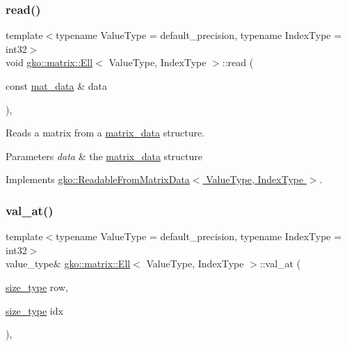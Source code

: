 \mbox{\label{classgko_1_1matrix_1_1Ell_a2c877d9f7bbc57f97df5ab443954a6fd}} 
\subsubsection{\texorpdfstring{read()}{read()}}
{\footnotesize\ttfamily template$<$typename Value\+Type = default\+\_\+precision, typename Index\+Type = int32$>$ \\
void \hyperlink{classgko_1_1matrix_1_1Ell}{gko\+::matrix\+::\+Ell}$<$ Value\+Type, Index\+Type $>$\+::read (\begin{DoxyParamCaption}\item[{const \hyperlink{structgko_1_1matrix__data}{mat\+\_\+data} \&}]{data }\end{DoxyParamCaption})\hspace{0.3cm}{\ttfamily [override]}, {\ttfamily [virtual]}}



Reads a matrix from a \hyperlink{structgko_1_1matrix__data}{matrix\+\_\+data} structure. 


\begin{DoxyParams}{Parameters}
{\em data} & the \hyperlink{structgko_1_1matrix__data}{matrix\+\_\+data} structure \\
\hline
\end{DoxyParams}


Implements \hyperlink{classgko_1_1ReadableFromMatrixData_add5c12e23b3ac3c8fbd607fa5a9656bb}{gko\+::\+Readable\+From\+Matrix\+Data$<$ Value\+Type, Index\+Type $>$}.

\mbox{\label{classgko_1_1matrix_1_1Ell_a0d2365837e44dc1889fc16000ff3b0a9}} 
\subsubsection{\texorpdfstring{val\+\_\+at()}{val\_at()}\hspace{0.1cm}{\footnotesize\ttfamily [1/2]}}
{\footnotesize\ttfamily template$<$typename Value\+Type = default\+\_\+precision, typename Index\+Type = int32$>$ \\
value\+\_\+type\& \hyperlink{classgko_1_1matrix_1_1Ell}{gko\+::matrix\+::\+Ell}$<$ Value\+Type, Index\+Type $>$\+::val\+\_\+at (\begin{DoxyParamCaption}\item[{\hyperlink{namespacegko_a6e5c95df0ae4e47aab2f604a22d98ee7}{size\+\_\+type}}]{row,  }\item[{\hyperlink{namespacegko_a6e5c95df0ae4e47aab2f604a22d98ee7}{size\+\_\+type}}]{idx }\end{DoxyParamCaption})\hspace{0.3cm}{\ttfamily [inline]}, {\ttfamily [noexcept]}}




